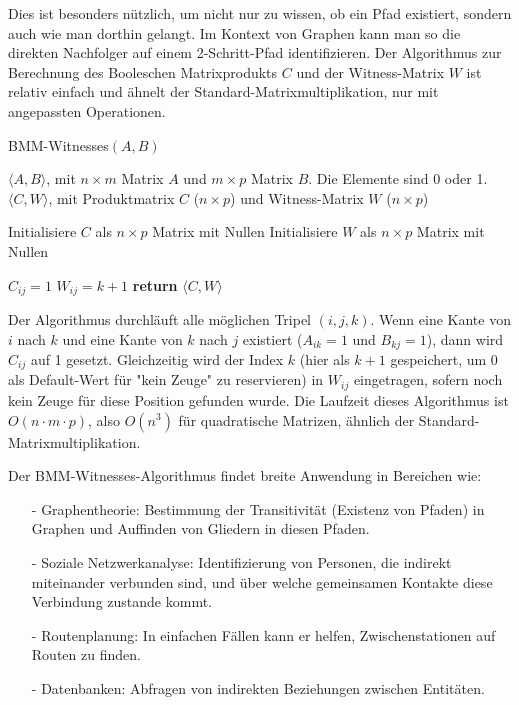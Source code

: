 \documentclass{scrartcl}
\numberwithin{equation}{section}
\begin{document}
Dies ist besonders nützlich, um nicht nur zu wissen, ob ein Pfad existiert, sondern auch wie man dorthin gelangt. Im Kontext von Graphen kann man so die direkten Nachfolger auf einem 2-Schritt-Pfad identifizieren. Der Algorithmus zur Berechnung des Booleschen Matrixprodukts $C$ und der Witness-Matrix $W$ ist relativ einfach und ähnelt der Standard-Matrixmultiplikation, nur mit angepassten Operationen.

\begin{algorithm}
	\caption{BMM-Witnesses$(A, B)$}
	\label{alg:bmm_witnesses}
	\begin{algorithmic}[1]
		\Require $\langle A, B \rangle$, mit $n \times m$ Matrix $A$ und $m \times p$ Matrix $B$. Die Elemente sind 0 oder 1.
		\Ensure $\langle C, W \rangle$, mit Produktmatrix $C$ ($n \times p$) und Witness-Matrix $W$ ($n \times p$)
		
		\State Initialisiere $C$ als $n \times p$ Matrix mit Nullen
		\State Initialisiere $W$ als $n \times p$ Matrix mit Nullen
		
		\State $C_{ij} = 1$
		 
		\State $W_{ij} = k+1$ 
		\EndIf
		\EndIf
		\EndFor
		\EndFor
		\EndFor
		\State \textbf{return} $\langle C, W \rangle$
	\end{algorithmic}
\end{algorithm}

Der Algorithmus durchläuft alle möglichen Tripel $(i, j, k)$. Wenn eine Kante von $i$ nach $k$ und eine Kante von $k$ nach $j$ existiert ($A_{ik}=1$ und $B_{kj}=1$), dann wird $C_{ij}$ auf 1 gesetzt. Gleichzeitig wird der Index $k$ (hier als $k+1$ gespeichert, um 0 als Default-Wert für "kein Zeuge" zu reservieren) in $W_{ij}$ eingetragen, sofern noch kein Zeuge für diese Position gefunden wurde. Die Laufzeit dieses Algorithmus ist $O(n \cdot m \cdot p)$, also $O(n^3)$ für quadratische Matrizen, ähnlich der Standard-Matrixmultiplikation.

Der BMM-Witnesses-Algorithmus findet breite Anwendung in Bereichen wie:
\begin{itemize}
	\item[-] Graphentheorie: Bestimmung der Transitivität (Existenz von Pfaden) in Graphen und Auffinden von Gliedern in diesen Pfaden.
	\item[-] Soziale Netzwerkanalyse: Identifizierung von Personen, die indirekt miteinander verbunden sind, und über welche gemeinsamen Kontakte diese Verbindung zustande kommt.
	\item[-] Routenplanung: In einfachen Fällen kann er helfen, Zwischenstationen auf Routen zu finden.
	\item[-] Datenbanken: Abfragen von indirekten Beziehungen zwischen Entitäten.
\end{itemize}
\end{document}
